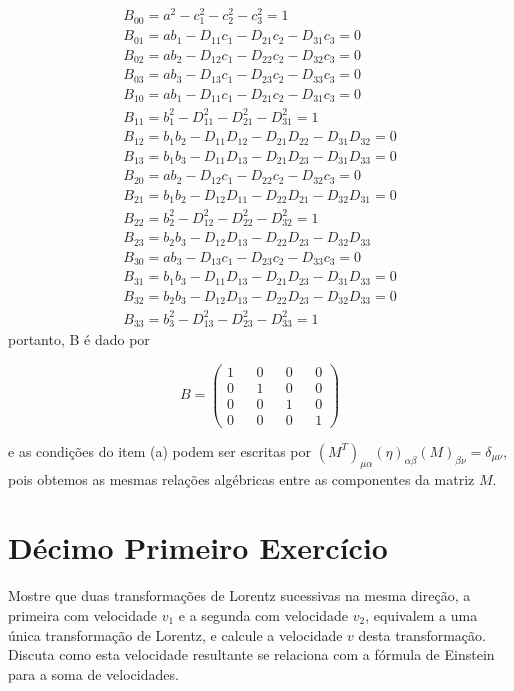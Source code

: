 \documentclass[10pt,a4paper]{article}
\begin{document}
\begin{eqnarray}
	B_{00} = a^2 -c_1^2 - c_2^2 - c_3^2 =1\nonumber\\
	B_{01} = ab_1 - D_{11}c_1 - D_{21}c_2 - D_{31}c_3=0 \nonumber\\
	B_{02} = ab_2 - D_{12}c_1 - D_{22}c_2 - D_{32}c_3=0 \nonumber\\
	B_{03} = ab_3 - D_{13}c_1 - D_{23}c_2 - D_{33}c_3=0 \nonumber\\
	B_{10} = ab_1 - D_{11}c_1 - D_{21}c_2 - D_{31}c_3=0 \nonumber\\
	B_{11} = b_1^2 - D_{11}^2 - D_{21}^2 - D_{31}^2=1 \nonumber\\
	B_{12} = b_1b_2 - D_{11}D_{12} - D_{21}D_{22} - D_{31}D_{32} =0\nonumber\\
	B_{13} = b_1b_3 - D_{11}D_{13} - D_{21}D_{23} - D_{31}D_{33}=0 \nonumber\\
	B_{20} = ab_2 - D_{12}c_1 - D_{22}c_2 - D_{32}c_3=0 \nonumber\\
	B_{21} = b_1b_2 - D_{12}D_{11} - D_{22}D_{21} - D_{32}D_{31}=0 \nonumber\\
	B_{22} = b_2^2 - D_{12}^2 - D_{22}^2 - D_{32}^2=1 \nonumber\\
	B_{23} = b_2b_3 - D_{12}D_{13} - D_{22}D_{23} - D_{32}D_{33} \nonumber\\
	B_{30} = ab_3 - D_{13}c_1 - D_{23}c_2 - D_{33}c_3 =0\nonumber\\
	B_{31} = b_1b_3 - D_{11}D_{13} - D_{21}D_{23} - D_{31}D_{33} =0\nonumber\\
	B_{32} = b_2b_3 - D_{12}D_{13} - D_{22}D_{23} - D_{32}D_{33}=0 \nonumber\\
	B_{33} = b_3^2 - D_{13}^2 - D_{23}^2 - D_{33}^2 =1 \nonumber
\end{eqnarray}
portanto, B é dado por

$$B = \left(\begin{matrix}
	1&&0&&0&&0\\
	0&&1&&0&&0\\
	0&&0&&1&&0\\
	0&&0&&0&&1
\end{matrix}\right)$$

e as condições do item (a) podem ser escritas por $ (M^T)_{\mu\alpha} (\eta)_{\alpha\beta} (M)_{\beta\nu }= \delta_{\mu\nu} $, pois obtemos as mesmas relações algébricas entre as componentes da matriz $ M $.

\section{Décimo Primeiro Exercício}
Mostre que duas transformações de Lorentz sucessivas na mesma direção, a primeira com velocidade $ v_1 $ e a segunda com velocidade $ v_2 $, equivalem
a uma única transformação de Lorentz, e calcule a velocidade $ v $ desta transformação. Discuta como esta velocidade resultante se relaciona com a fórmula de Einstein para a soma de velocidades. 
\end{document}
